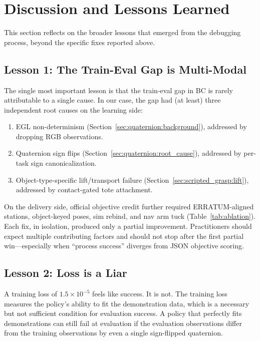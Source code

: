 \section{Discussion and Lessons Learned}
\label{sec:discussion}

This section reflects on the broader lessons that emerged from the debugging process, beyond the specific fixes reported above.

\subsection{Lesson 1: The Train-Eval Gap is Multi-Modal}
\label{sec:discussion:multimodal}

The single most important lesson is that the train-eval gap in BC is rarely attributable to a single cause. In our case, the gap had (at least) three independent root causes on the learning side:
\begin{enumerate}[leftmargin=*,itemsep=2pt]
    \item EGL non-determinism (Section~\ref{sec:quaternion:background}), addressed by dropping RGB observations.
    \item Quaternion sign flips (Section~\ref{sec:quaternion:root_cause}), addressed by per-task sign canonicalization.
    \item Object-type-specific lift/transport failure (Section~\ref{sec:scripted_grasp:lift}), addressed by contact-gated tote attachment.
\end{enumerate}

On the delivery side, official objective credit further required ERRATUM-aligned stations, object-keyed poses, sim rebind, and nav arm tuck (Table~\ref{tab:ablation}). Each fix, in isolation, produced only a partial improvement. Practitioners should expect multiple contributing factors and should not stop after the first partial win---especially when ``process success'' diverges from JSON objective scoring.

\subsection{Lesson 2: Loss is a Liar}
\label{sec:discussion:loss_lier}

A training loss of $1.5 \times 10^{-5}$ feels like success. It is not. The training loss measures the policy's ability to fit the demonstration data, which is a necessary but not sufficient condition for evaluation success. A policy that perfectly fits demonstrations can still fail at evaluation if the evaluation observations differ from the training observations by even a single sign-flipped quaternion.

